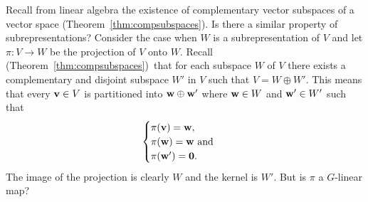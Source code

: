 Recall from linear algebra the existence of complementary vector subspaces of a vector space (Theorem~\ref{thm:compsubspaces}).  Is there a similar property of subrepresentations? Consider the case when $W$ is a subrepresentation of $V$ and let $\pi: V \rightarrow W$ be the projection of $V$ onto $W$. Recall (Theorem~\ref{thm:compsubspaces})~that for each subspace $W$ of $V$ there exists a complementary and disjoint subspace $W'$ in $V$ such that $V = W \oplus W'$. This means that every $\mathbf{v} \in V$ is partitioned into $\mathbf{w} \oplus \mathbf{w}'$ where $\mathbf{w} \in W$ and $\mathbf{w}' \in W'$ such that 
\begin{align*}
	\begin{cases}
		\pi(\mathbf{v}) = \mathbf{w}, \\
		\pi(\mathbf{w}) = \mathbf{w} \text{ and } \\
		\pi(\mathbf{w}') = \mathbf{0}.
	\end{cases}
\end{align*} 
The image of the projection is clearly $W$ and the kernel is $W'$. But is $\pi$ a $G$-linear map?
